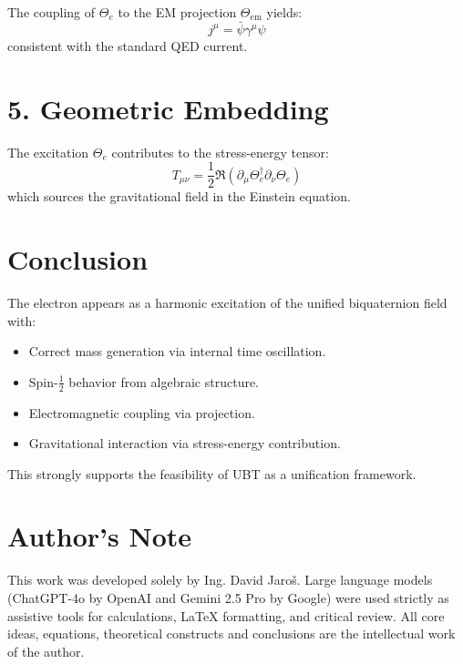 \documentclass[12pt]{article}
\begin{document}
The coupling of $\Theta_e$ to the EM projection $\Theta_{\text{em}}$ yields:
\[
j^\mu = \bar{\psi} \gamma^\mu \psi
\]
consistent with the standard QED current.

\section*{5. Geometric Embedding}

The excitation $\Theta_e$ contributes to the stress-energy tensor:
\[
T_{\mu\nu} = \frac{1}{2} \Re \left( \partial_\mu \Theta_e^\dagger \partial_\nu \Theta_e \right)
\]
which sources the gravitational field in the Einstein equation.

\section*{Conclusion}

The electron appears as a harmonic excitation of the unified biquaternion field with:
\begin{itemize}
    \item Correct mass generation via internal time oscillation.
    \item Spin-$\frac{1}{2}$ behavior from algebraic structure.
    \item Electromagnetic coupling via projection.
    \item Gravitational interaction via stress-energy contribution.
\end{itemize}

This strongly supports the feasibility of UBT as a unification framework.


\section*{Author's Note}

This work was developed solely by Ing. David Jaroš.  
Large language models (ChatGPT-4o by OpenAI and Gemini 2.5 Pro by Google) were used strictly as assistive tools for calculations, LaTeX formatting, and critical review.  
All core ideas, equations, theoretical constructs and conclusions are the intellectual work of the author.
\end{document}
